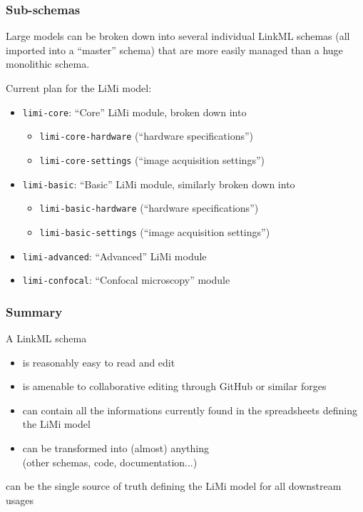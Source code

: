 \begin{frame}
  \frametitle{Sub-schemas}

  Large models can be broken down into several individual LinkML schemas
  (all imported into a ``master'' schema) that are more easily managed 
  than a huge monolithic schema.

  \bigskip
  Current plan for the LiMi model:
  \begin{itemize}
    \item \texttt{limi-core}: ``Core'' LiMi module, broken down into
      \begin{itemize}
        \item \texttt{limi-core-hardware} (``hardware specifications'')
        \item \texttt{limi-core-settings} (``image acquisition settings'')
      \end{itemize}
    \item \texttt{limi-basic}: ``Basic'' LiMi module, similarly broken down into
      \begin{itemize}
        \item \texttt{limi-basic-hardware} (``hardware specifications'')
        \item \texttt{limi-basic-settings} (``image acquisition settings'')
      \end{itemize}
    \item \texttt{limi-advanced}: ``Advanced'' LiMi module
    \item \texttt{limi-confocal}: ``Confocal microscopy'' module
  \end{itemize}
\end{frame}

\begin{frame}
  \frametitle{Summary}

  A LinkML schema
  \begin{itemize}
    \item is reasonably easy to read and edit
    \item is amenable to collaborative editing through GitHub or
          similar forges
    \item can contain all the informations currently found in
          the spreadsheets defining the LiMi model
    \item can be transformed into (almost) anything\\
          (other schemas, code, documentation...)
  \end{itemize}

  \begin{block}{}
    can be the single source of truth defining the LiMi
    model for all downstream usages
  \end{block}
\end{frame}

